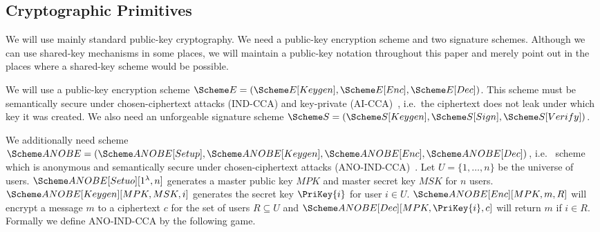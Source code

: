 \subsection{Cryptographic Primitives}
\label{CryptoPrimitives}

We will use mainly standard public-key cryptography.
We need a public-key encryption scheme and two signature schemes.
Although we can use shared-key mechanisms in some places, we will maintain 
a public-key notation throughout this paper and merely point out in the places 
where a shared-key scheme would be possible.

We will use a public-key encryption scheme \(\E = (\E[Keygen], \E[Enc], 
  \E[Dec])\).
This scheme must be semantically secure under chosen-ciphertext attacks 
(IND-CCA) and key-private (AI-CCA)~\cite{KeyPrivacy}, i.e.\ the ciphertext does 
not leak under which key it was created.
We also need an unforgeable signature scheme \(\S = (\S[Keygen], \S[Sign], 
  \S[Verify])\).

We additionally need  scheme \(\ANOBE = (\ANOBE[Setup],\allowbreak 
  \ANOBE[Keygen],\allowbreak \ANOBE[Enc],\allowbreak \ANOBE[Dec])\), i.e.\ 
 scheme which is anonymous and semantically secure under 
chosen-ciphertext attacks (ANO-IND-CCA)~\cite{ANOBE}.
Let \(U = \{1, \ldots, n\}\) be the universe of users.
\(\ANOBE[Setuo][1^\lambda, n]\) generates a master public key \(MPK\) and 
master secret key \(MSK\) for \(n\) users.
\(\ANOBE[Keygen][MPK, MSK, i]\) generates the secret key \(\PriKey{i}\) for 
user \(i\in U\).
\(\ANOBE[Enc][MPK, m, R]\) will encrypt a message \(m\) to a ciphertext \(c\) 
for the set of users \(R\subseteq U\) and \(\ANOBE[Dec][MPK, \PriKey{i}, c]\) 
will return \(m\) if \(i\in R\).
Formally we define ANO-IND-CCA by the following game.

